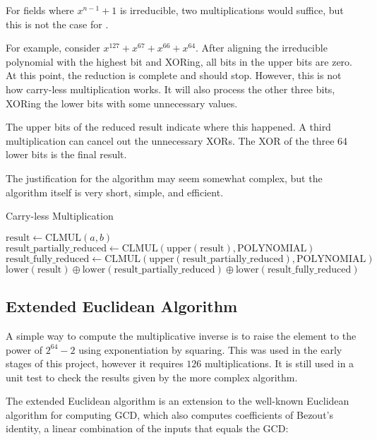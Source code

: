 For fields where $x^{n - 1} + 1$ is irreducible, two multiplications would suffice, but this is not the case for .

For example, consider $x^{127} + x^{67} + x^{66} + x^{64}$.
After aligning the irreducible polynomial with the highest bit and XORing, all bits in the upper bits are zero.
At this point, the reduction is complete and should stop.
However, this is not how carry-less multiplication works. It will also process the other three bits, XORing the lower bits with some unnecessary values.

The upper bits of the reduced result indicate where this happened. A third multiplication can cancel out the unnecessary XORs.
The XOR of the three 64 lower bits is the final result.

The justification for the algorithm may seem somewhat complex, but the algorithm itself is very short, simple, and efficient.

\begin{algorithm}
\caption{Carry-less Multiplication}
\begin{algorithmic}
\State $\text{result} \gets \text{CLMUL}(a, b)$
\State $\text{result\_partially\_reduced} \gets \text{CLMUL}(\text{upper}(\text{result}), \text{POLYNOMIAL})$
\State $\text{result\_fully\_reduced} \gets \text{CLMUL}(\text{upper}(\text{result\_partially\_reduced}), \text{POLYNOMIAL})$
\State \Return $\text{lower}(\text{result}) \oplus \text{lower}(\text{result\_partially\_reduced}) \oplus \text{lower}(\text{result\_fully\_reduced})$
\EndFunction
\end{algorithmic}
\end{algorithm}

\subsection{Extended Euclidean Algorithm}

A simple way to compute the multiplicative inverse is to raise the element to the power of $2^{64} - 2$ using exponentiation by squaring.
This was used in the early stages of this project, however it requires $126$ multiplications.
It is still used in a unit test to check the results given by the more complex algorithm.

The extended Euclidean algorithm \cite{extended-euclid} is an extension to the well-known Euclidean algorithm for computing GCD, which also computes coefficients of Bezout's identity, a linear combination of the inputs that equals the GCD:

